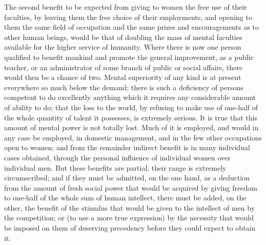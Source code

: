 \documentclass[12pt]{report}
\begin{document}
The second benefit to be expected from giving to women the free use of their faculties, by leaving them the free choice of their employments, and opening to them the same field of occupation and the same prizes and encouragements as to other human beings, would be that of doubling the mass of mental faculties available for the higher service of humanity. Where there is now one person qualified to benefit mankind and promote the general improvement, as a public teacher, or an administrator of some branch of public or social affairs, there would then be a chance of two. Mental superiority of any kind is at present everywhere so much below the demand; there is such a deficiency of persons competent to do excellently anything which it requires any considerable amount of ability to do; that the loss to the world, by refusing to make use of one-half of the whole quantity of talent it possesses, is extremely serious. It is true that this amount of mental power is not totally lost. Much of it is employed, and would in any case be employed, in domestic management, and in the few other occupations open to women; and from the remainder indirect benefit is in many individual cases obtained, through the personal influence of individual women over individual men. But these benefits are partial; their range is extremely circumscribed; and if they must be admitted, on the one hand, as a deduction from the amount of fresh social power that would be acquired by giving freedom to one-half of the whole sum of human intellect, there must be added, on the other, the benefit of the stimulus that would be given to the intellect of men by the competition; or (to use a more true expression) by the necessity that would be imposed on them of deserving precedency before they could expect to obtain it.
\end{document}
